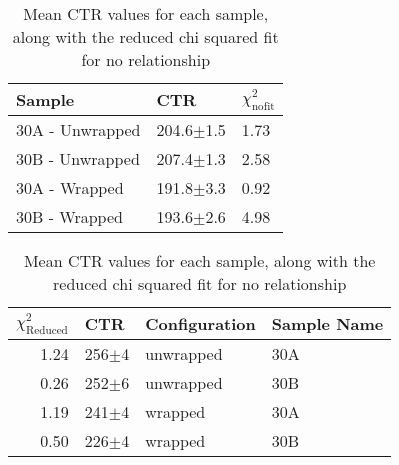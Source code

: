 \begin{table}
\label{tab:doiresults}
\caption{Mean CTR values for each sample, along with the reduced chi squared fit for no relationship}
\begin{tabular}{lll}
\hline
Sample &            CTR &   $\chi^2_\text{nofit}$ \\
\hline
   30A - Unwrapped &  204.6$\pm$1.5 &  1.73 \\
   30B - Unwrapped &  207.4$\pm$1.3 &  2.58 \\
   30A - Wrapped &  191.8$\pm$3.3 &  0.92 \\
   30B - Wrapped &  193.6$\pm$2.6 &  4.98 \\
\hline
\end{tabular}
\end{table}

\begin{table}
\label{tab:doiresults}
\caption{Mean CTR values for each sample, along with the reduced chi squared fit for no relationship}
\begin{tabular}{rlll}
\hline
 $\chi^2_\text{Reduced}$ &        CTR & Configuration & Sample Name \\
\hline
                   1.24 &  256$\pm$4 &     unwrapped &         30A \\
                   0.26 &  252$\pm$6 &     unwrapped &         30B \\
                   1.19 &  241$\pm$4 &       wrapped &         30A \\
                   0.50 &  226$\pm$4 &       wrapped &         30B \\
\hline
\end{tabular}
\end{table}
